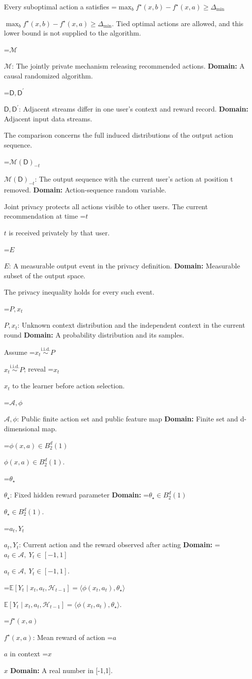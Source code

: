 \documentclass[10pt,a4paper]{article}
\newcommand{\AtlasMath}[1]{\par\begingroup\centering\setbox0=\hbox{$\displaystyle #1$}\ifdim\wd0>1.4\linewidth\typeout{ATLAS WIDE FORMULA: \the\wd0}\fi\ifdim\wd0>\linewidth\resizebox{\linewidth}{!}{\box0}\else\box0\fi\par\endgroup}
\newcommand{\AtlasInlineMath}[1]{\begingroup\setbox0=\hbox{$#1$}\ifdim\wd0>.4\linewidth\endgroup\AtlasMath{#1}\else\endgroup$#1$\fi}
\begin{document}
Every suboptimal action a satisfies \AtlasInlineMath{\max_b f^\star(x,b)-f^\star(x,a)\ge\Delta_{\min}}. Tied optimal actions are allowed, and this lower bound is not supplied to the algorithm.

\AtlasInlineMath{\mathcal M}: The jointly private mechanism releasing recommended actions. \textbf{Domain:} A causal randomized algorithm.

\AtlasInlineMath{\mathsf D,\mathsf D^{\prime}}: Adjacent streams differ in one user’s context and reward record. \textbf{Domain:} Adjacent input data streams.

The comparison concerns the full induced distributions of the output action sequence.

\AtlasInlineMath{\mathcal M(\mathsf D)_{-t}}: The output sequence with the current user’s action at position t removed. \textbf{Domain:} Action-sequence random variable.

Joint privacy protects all actions visible to other users. The current recommendation at time \AtlasInlineMath{t} is received privately by that user.

\AtlasInlineMath{E}: A measurable output event in the privacy definition. \textbf{Domain:} Measurable subset of the output space.

The privacy inequality holds for every such event.

\AtlasInlineMath{P,x_t}: Unknown context distribution and the independent context in the current round \textbf{Domain:} A probability distribution and its samples.

Assume \AtlasInlineMath{x_t\overset{\mathrm{i.i.d.}}\sim P}; reveal \AtlasInlineMath{x_t} to the learner before action selection.

\AtlasInlineMath{\mathcal A,\phi}: Public finite action set and public feature map \textbf{Domain:} Finite set and d-dimensional map.

\AtlasInlineMath{\phi(x,a)\in B_2^d(1)}.

\AtlasInlineMath{\theta_\star}: Fixed hidden reward parameter \textbf{Domain:} \AtlasInlineMath{\theta_\star\in B_2^d(1)}.

\AtlasInlineMath{a_t,Y_t}: Current action and the reward observed after acting \textbf{Domain:} \AtlasInlineMath{a_t\in\mathcal A,\ Y_t\in[-1,1]}.

\AtlasInlineMath{\mathbb E[Y_t\mid x_t,a_t,\mathcal H_{t-1}]=\langle\phi(x_t,a_t),\theta_\star\rangle}.

\AtlasInlineMath{f^\star(x,a)}: Mean reward of action \AtlasInlineMath{a} in context \AtlasInlineMath{x} \textbf{Domain:} A real number in [-1,1].
\end{document}
